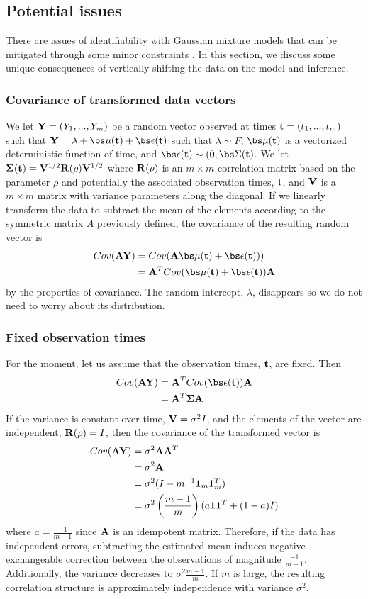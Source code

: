 \subsection{Potential issues}
There are issues of identifiability with Gaussian mixture models that can be mitigated through some minor constraints \cite{mclachlan2000}. In this section, we discuss some unique consequences of vertically shifting the data on the model and inference.

\subsubsection{Covariance of transformed data vectors}
We let $\mathbf Y=(Y_{1},...,Y_{m})$ be a random vector observed at times $\mathbf t=(t_{1},...,t_{m})$ such that
$\B Y = \lambda + \bs\mu(\B t) + \bs\epsilon(\B t)$
such that $\lambda\sim F$, $\bs\mu(\B t)$ is a vectorized deterministic function of time, and $\bs\epsilon(\B t)\sim(0,\bs\Sigma(\B t)$. We let $\mathbf\Sigma(\mathbf t) =\mathbf V^{1/2}\mathbf R(\rho)\mathbf V^{1/2}$ where $\mathbf R(\rho)$ is an $m\times m$ correlation matrix based on the parameter $\rho$ and potentially the associated observation times, $\mathbf t$, and $\mathbf V$ is a $m\times m$ matrix with variance parameters along the diagonal. If we linearly transform the data to subtract the mean of the elements according to the symmetric matrix $A$ previously defined, the covariance of the resulting random vector is
\begin{align*}
Cov(\B A\B Y) &= Cov(\B A\bs\mu(\B t)+\bs\epsilon(\B t)))\\
&= \B A^{T}Cov(\bs\mu(\B t)+\bs\epsilon(\B t))\B A
\end{align*}
by the properties of covariance. The random intercept, $\lambda$, disappears so we do not need to worry about its distribution. 
\subsubsection{Fixed observation times}
For the moment, let us assume that the observation times, $\mathbf t$, are fixed. Then
\begin{align*}
Cov(\B A\B Y)&= \B A^{T}Cov(\bs\epsilon(\B t))\B A\\
&= \B A^{T}\B\Sigma \B A
\end{align*}
If the variance is constant over time, $\mathbf V=\sigma^{2}I$, and the elements of the vector are independent, $\mathbf R(\rho)=I$, then the covariance of the transformed vector is
\begin{align*} 
Cov(\mathbf A\mathbf Y) &= \sigma^{2}\mathbf A\mathbf A^{T} \\
&=\sigma^{2}\mathbf A\\
&= \sigma^{2}(I - m^{-1}\mathbf1_{m}\mathbf1_{m}^{T})\\
&=\sigma^{2}\left(\frac{m-1}{m}\right)(a\mathbf 1\mathbf 1^{T}+ (1-a)I)
\end{align*}
 where $a=\frac{-1}{m-1}$ since $\mathbf A$ is an idempotent matrix. Therefore, if the data has independent errors, subtracting the estimated mean induces negative exchangeable correction between the observations of magnitude $\frac{-1}{m-1}$. Additionally, the variance decreases to $\sigma^{2}\frac{m-1}{m}$. If $m$ is large, the resulting correlation structure is approximately independence with variance $\sigma^{2}$.
 
